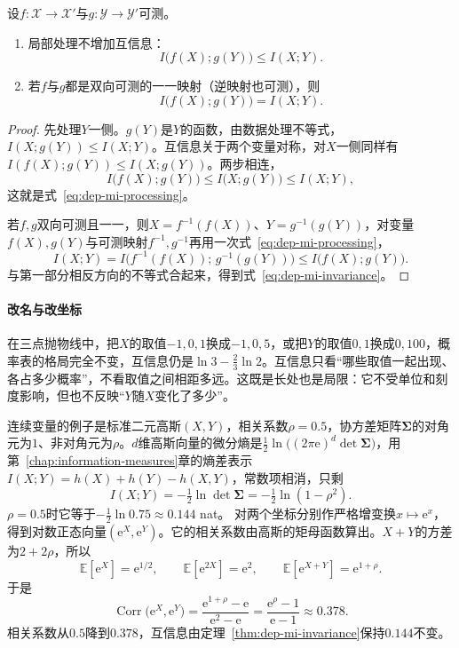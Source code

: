 \begin{theorem}[互信息的变换性质]
\label{thm:dep-mi-invariance}
设$f:\mathcal{X}\to\mathcal{X}'$与$g:\mathcal{Y}\to\mathcal{Y}'$可测。
\begin{enumerate}
  \item 局部处理不增加互信息：
  \begin{equation}
    I\bigl(f(X);g(Y)\bigr)\leq I(X;Y).
    \label{eq:dep-mi-processing}
  \end{equation}
  \item 若$f$与$g$都是双向可测的一一映射（逆映射也可测），则
  \begin{equation}
    I\bigl(f(X);g(Y)\bigr)=I(X;Y).
    \label{eq:dep-mi-invariance}
  \end{equation}
\end{enumerate}
\end{theorem}

\begin{proof}
先处理$Y$一侧。$g(Y)$是$Y$的函数，由数据处理不等式，$I(X;g(Y))\leq I(X;Y)$。互信息关于两个变量对称，对$X$一侧同样有$I(f(X);g(Y))\leq I(X;g(Y))$。两步相连，
\[
  I\bigl(f(X);g(Y)\bigr)\leq I\bigl(X;g(Y)\bigr)\leq I(X;Y),
\]
这就是式~\eqref{eq:dep-mi-processing}。

若$f,g$双向可测且一一，则$X=f^{-1}(f(X))$、$Y=g^{-1}(g(Y))$，对变量$f(X),g(Y)$与可测映射$f^{-1},g^{-1}$再用一次式~\eqref{eq:dep-mi-processing}，
\[
  I(X;Y)=I\bigl(f^{-1}(f(X));\,g^{-1}(g(Y))\bigr)\leq I\bigl(f(X);g(Y)\bigr).
\]
与第一部分相反方向的不等式合起来，得到式~\eqref{eq:dep-mi-invariance}。
\end{proof}

\paragraph{改名与改坐标}
在三点抛物线中，把$X$的取值$-1,0,1$换成$-1,0,5$，或把$Y$的取值$0,1$换成$0,100$，概率表的格局完全不变，互信息仍是$\ln3-\frac23\ln2$。互信息只看“哪些取值一起出现、各占多少概率”，不看取值之间相距多远。这既是长处也是局限：它不受单位和刻度影响，但也不反映“$Y$随$X$变化了多少”。

连续变量的例子是标准二元高斯$(X,Y)$，相关系数$\rho=0.5$，协方差矩阵$\bm{\Sigma}$的对角元为$1$、非对角元为$\rho$。$d$维高斯向量的微分熵是$\frac12\ln\bigl((2\pi\mathrm{e})^{d}\det\bm{\Sigma}\bigr)$，用第~\ref{chap:information-measures}章的熵差表示$I(X;Y)=h(X)+h(Y)-h(X,Y)$，常数项相消，只剩
\begin{equation}
  I(X;Y)=-\tfrac12\ln\det\bm{\Sigma}=-\tfrac12\ln(1-\rho^{2}).
  \label{eq:dep-gauss-mi}
\end{equation}
$\rho=0.5$时它等于$-\frac12\ln0.75\approx0.144$ nat。
对两个坐标分别作严格增变换$x\mapsto\mathrm{e}^{x}$，得到对数正态向量$(\mathrm{e}^{X},\mathrm{e}^{Y})$。它的相关系数由高斯的矩母函数算出。$X+Y$的方差为$2+2\rho$，所以
\[
  \mathbb{E}[\mathrm{e}^{X}]=\mathrm{e}^{1/2},\qquad \mathbb{E}[\mathrm{e}^{2X}]=\mathrm{e}^{2},\qquad \mathbb{E}[\mathrm{e}^{X+Y}]=\mathrm{e}^{1+\rho}.
\]
于是
\[
  \operatorname{Corr}\bigl(\mathrm{e}^{X},\mathrm{e}^{Y}\bigr)=\frac{\mathrm{e}^{1+\rho}-\mathrm{e}}{\mathrm{e}^{2}-\mathrm{e}}=\frac{\mathrm{e}^{\rho}-1}{\mathrm{e}-1}\approx0.378 .
\]
相关系数从$0.5$降到$0.378$，互信息由定理~\ref{thm:dep-mi-invariance}保持$0.144$不变。

